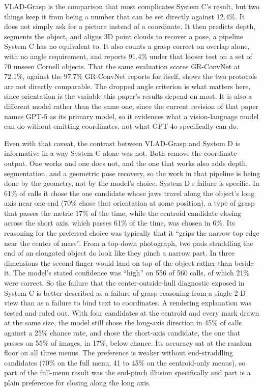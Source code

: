 \documentclass[12pt,letterpaper]{article}
\begin{document}
VLAD-Grasp is the comparison that most complicates System C's result,
but two things keep it from being a number that can be set directly
against 12.4\%. It does not simply ask for a picture instead of a
coordinate. It then predicts depth, segments the object, and aligns 3D
point clouds to recover a pose, a pipeline System C has no equivalent
to. It also counts a grasp correct on overlap alone, with no angle
requirement, and reports 91.4\% under that looser test on a set of 70
unseen Cornell objects. That the same evaluation scores GR-ConvNet at
72.1\%, against the 97.7\% GR-ConvNet reports for itself, shows the two
protocols are not directly comparable. The dropped angle criterion is
what matters here, since orientation is the variable this paper's
results depend on most. It is also a different model rather than the
same one, since the current revision of that paper names GPT-5 as its
primary model, so it evidences what a vision-language model can do
without emitting coordinates, not what GPT-4o specifically can do.

Even with that caveat, the contrast between VLAD-Grasp and System D
is informative in a way System C alone was not. Both remove the
coordinate output. One works and one does not, and the one that works
also adds depth, segmentation, and a geometric pose recovery, so the
work in that pipeline is being done by the geometry, not by the
model's choice. System D's failure is specific. In 61\% of calls it
chose the one candidate whose jaws travel along the object's long axis
near one end (70\% chose that orientation at some position), a type of
grasp that passes the metric 17\% of the time, while the centroid
candidate closing across the short axis, which passes 61\% of the
time, was chosen in 6\%. Its reasoning for
the preferred choice was typically that it ``grips the narrow top edge
near the center of mass''. From a top-down photograph, two pads
straddling the end of an elongated object do look like they pinch a
narrow part. In three dimensions the second finger would land on top of
the object rather than beside it. The model's stated confidence was
``high'' on 556 of 560 calls, of which 21\% were correct. So the
failure that the center-outside-hull diagnostic exposed in System C is
better described as a failure of grasp reasoning from a single 2-D view
than as a failure to bind text to coordinates. A rendering explanation was
tested and ruled out. With four candidates at the centroid and every
mark drawn at the same size, the model still chose the long-axis
direction in 45\% of calls against a 25\% chance rate, and chose the
short-axis candidate, the one that passes on 55\% of images, in 17\%,
below chance. Its accuracy sat at the random floor on all three menus.
The preference is weaker without end-straddling candidates (70\% on
the full menu, 41 to 45\% on the centroid-only menus), so part of the
full-menu result was the end-pinch illusion specifically and part is a
plain preference for closing along the long axis.
\end{document}
